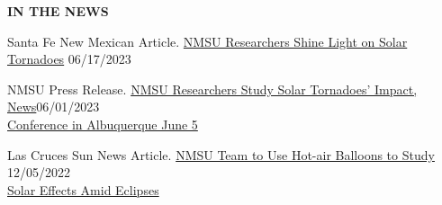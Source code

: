 \documentclass{resume} %
\begin{document}
\vspace{-0.1in}
\begin{rSection}{\textbf{IN THE NEWS}}
\vspace{0.02in}


{Santa Fe New Mexican Article. \href{https://www.santafenewmexican.com/news/local_news/nmsu-researchers-shine-light-on-solar-tornadoes/article_e44fa558-096b-11ee-97c9-132701cfe264.html}{NMSU Researchers Shine Light on Solar Tornadoes}} \hfill{06/17/2023} 

{NMSU Press Release. \href{https://newsroom.nmsu.edu/news/nmsu-researchers-study-solar-tornadoes--impact--news-conference-in-albuquerque-june-5/s/0bf4893e-8456-4c9c-b68e-1a4f1f88cf5b}{NMSU Researchers Study Solar Tornadoes’ Impact, News}}\hfill{06/01/2023} \\
{\href{https://newsroom.nmsu.edu/news/nmsu-researchers-study-solar-tornadoes--impact--news-conference-in-albuquerque-june-5/s/0bf4893e-8456-4c9c-b68e-1a4f1f88cf5b}{Conference in Albuquerque June 5}} 

{Las Cruces Sun News Article. \href{https://www.lcsun-news.com/story/life/2022/12/05/star-news-nmsu-team-to-use-hot-air-balloons-to-study-sun-amid-eclipses/69699732007/}{NMSU Team to Use Hot-air Balloons to Study} \hfill{12/05/2022}} \\
\href{https://www.lcsun-news.com/story/life/2022/12/05/star-news-nmsu-team-to-use-hot-air-balloons-to-study-sun-amid-eclipses/69699732007/}{Solar Effects Amid Eclipses}  
\end{rSection} 
\end{document}
